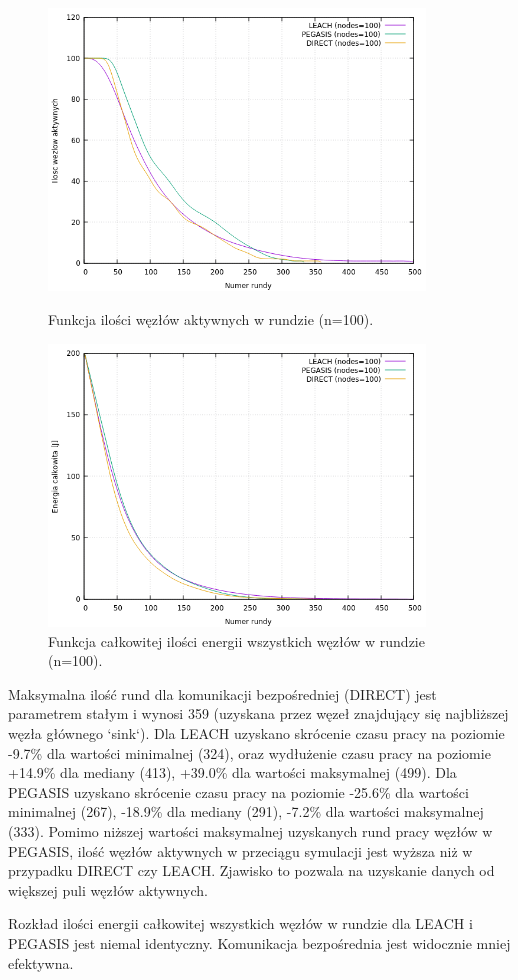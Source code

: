 \documentclass[a4paper,12pt,twoside,openany]{report}
\begin{document}
\begin{figure}[H]
 \centering
 \includegraphics[width=10cm]{images/gnuplot/test_2/nodes_in_round_100.png}
 \caption{Funkcja ilości węzłów aktywnych w rundzie (n=100).}
 \includegraphics[width=10cm]{images/gnuplot/test_2/energy_in_round_100.png}
 \caption{Funkcja całkowitej ilości energii wszystkich węzłów w rundzie (n=100).}
\end{figure}

\par
Maksymalna ilość rund dla komunikacji bezpośredniej (DIRECT) jest parametrem stałym i wynosi 359 (uzyskana przez węzeł znajdujący się najbliższej węzła głównego `sink`).
Dla LEACH uzyskano skrócenie czasu pracy na poziomie -9.7\% dla wartości minimalnej (324), oraz wydłużenie czasu pracy na poziomie +14.9\% dla mediany (413), +39.0\% dla wartości maksymalnej (499).
Dla PEGASIS uzyskano skrócenie czasu pracy na poziomie -25.6\% dla wartości minimalnej (267), -18.9\% dla mediany (291), -7.2\% dla wartości maksymalnej (333).
Pomimo niższej wartości maksymalnej uzyskanych rund pracy węzłów w PEGASIS, ilość węzłów aktywnych w przeciągu symulacji jest wyższa niż w przypadku DIRECT czy LEACH.
Zjawisko to pozwala na uzyskanie danych od większej puli węzłów aktywnych.
\par
Rozkład ilości energii całkowitej wszystkich węzłów w rundzie dla LEACH i PEGASIS jest niemal identyczny. Komunikacja bezpośrednia jest widocznie mniej efektywna.
\end{document}
